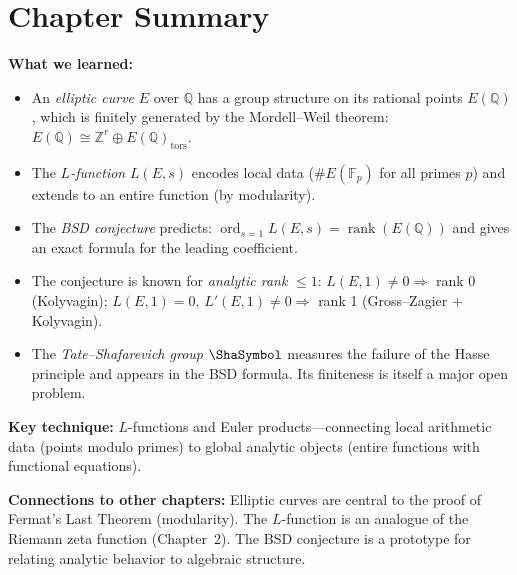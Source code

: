 \section*{Chapter Summary}

\noindent\textbf{What we learned:}
\begin{itemize}
  \item An \emph{elliptic curve} $E$ over $\mathbb{Q}$ has a group structure on its rational points $E(\mathbb{Q})$, which is finitely generated by the Mordell--Weil theorem: $E(\mathbb{Q}) \cong \mathbb{Z}^r \oplus E(\mathbb{Q})_{\mathrm{tors}}$.
  \item The \emph{$L$-function} $L(E,s)$ encodes local data ($\#E(\mathbb{F}_p)$ for all primes $p$) and extends to an entire function (by modularity).
  \item The \emph{BSD conjecture} predicts: $\operatorname{ord}_{s=1} L(E,s) = \operatorname{rank}(E(\mathbb{Q}))$ and gives an exact formula for the leading coefficient.
  \item The conjecture is known for \emph{analytic rank} $\le 1$: $L(E,1) \ne 0 \Rightarrow$ rank 0 (Kolyvagin); $L(E,1) = 0$, $L'(E,1) \ne 0 \Rightarrow$ rank 1 (Gross--Zagier + Kolyvagin).
  \item The \emph{Tate--Shafarevich group} $\Sha$ measures the failure of the Hasse principle and appears in the BSD formula. Its finiteness is itself a major open problem.
\end{itemize}

\noindent\textbf{Key technique:} $L$-functions and Euler products---connecting local arithmetic data (points modulo primes) to global analytic objects (entire functions with functional equations).

\noindent\textbf{Connections to other chapters:} Elliptic curves are central to the proof of Fermat's Last Theorem (modularity). The $L$-function is an analogue of the Riemann zeta function (Chapter~2). The BSD conjecture is a prototype for relating analytic behavior to algebraic structure.
